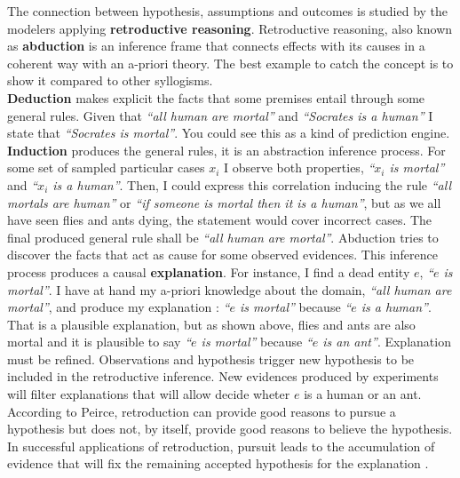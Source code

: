 \documentclass[11pt,oneside,a4paper,openright]{report}
\begin{document}
The connection between hypothesis, assumptions and outcomes is studied by the modelers applying \textbf{retroductive reasoning}\cite[p.34]{Premo2010}. Retroductive reasoning, also known as \textbf{abduction} is an inference frame that connects effects with its causes in a coherent way with an a-priori theory. The best example to catch the concept is to show it compared to other syllogisms.\\ \textbf{Deduction} makes explicit the facts that some premises entail through some general rules. Given that \textit{``all human are mortal''} and \textit{``Socrates is a human''} I state that \textit{``Socrates is mortal''}. You could see this as a kind of prediction engine. \textbf{Induction} produces the general rules, it is an abstraction inference process. For some set of sampled particular cases $x_i$ I observe both properties, \textit{``$x_i$ is mortal''} and \textit{``$x_i$ is a human''}. Then, I could express this correlation inducing the rule \textit{``all mortals are human''} or \textit{``if someone is mortal then it is a human''}, but as we all have seen flies and ants dying, the statement would cover incorrect cases. The final produced general rule shall be \textit{``all human are mortal''}. Abduction tries to discover the facts that act as cause for some observed evidences. This inference process produces a causal \textbf{explanation}. For instance, I find a dead entity $e$, \textit{``$e$ is mortal''}. I have at hand my a-priori knowledge about the domain, \textit{``all human are mortal''}, and produce my explanation : \textit{``$e$ is mortal''} because \textit{``$e$ is a human''}. That is a plausible explanation, but as shown above, flies and ants are also mortal and it is plausible to say \textit{``$e$ is mortal''} because \textit{``$e$ is an ant''}. Explanation must be refined. Observations and hypothesis trigger new hypothesis to be included in the retroductive inference. New evidences produced by experiments will filter explanations that will allow decide wheter $e$ is a human or an ant. According to Peirce, retroduction can provide good reasons to pursue a hypothesis but does not, by itself, provide good reasons to believe the hypothesis. In successful applications of retroduction, pursuit leads to the accumulation of evidence that will fix the remaining accepted hypothesis for the explanation \cite{Peirce_Abduction}.\\  
%
\end{document}
